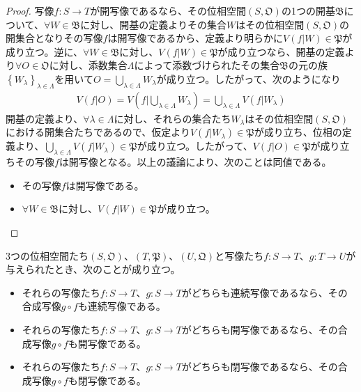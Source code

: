 \documentclass[dvipdfmx]{jsarticle}
\begin{document}
\begin{proof}
写像$f:S \rightarrow T$が開写像であるなら、その位相空間$\left( S,\mathfrak{O} \right)$の1つの開基$\mathfrak{B}$について、$\forall W \in \mathfrak{B}$に対し、開基の定義よりその集合$W$はその位相空間$\left( S,\mathfrak{O} \right)$の開集合となりその写像$f$は開写像であるから、定義より明らかに$V\left( f|W \right) \in \mathfrak{P}$が成り立つ。逆に、$\forall W \in \mathfrak{B}$に対し、$V\left( f|W \right) \in \mathfrak{P}$が成り立つなら、開基の定義より$\forall O \in \mathfrak{O}$に対し、添数集合$\varLambda$によって添数づけられたその集合$\mathfrak{B}$の元の族$\left\{ W_{\lambda} \right\}_{\lambda \in \varLambda}$を用いて$O = \bigcup_{\lambda \in \varLambda} W_{\lambda}$が成り立つ。したがって、次のようになり
\begin{align*}
V\left( f|O \right) = V\left( f|\bigcup_{\lambda \in \varLambda} W_{\lambda} \right) = \bigcup_{\lambda \in \varLambda} {V\left( f|W_{\lambda} \right)}
\end{align*}
開基の定義より、$\forall\lambda \in \varLambda$に対し、それらの集合たち$W_{\lambda}$はその位相空間$\left( S,\mathfrak{O} \right)$における開集合たちであるので、仮定より$V\left( f|W_{\lambda} \right) \in \mathfrak{P}$が成り立ち、位相の定義より、$\bigcup_{\lambda \in \varLambda} {V\left( f|W_{\lambda} \right)} \in \mathfrak{P}$が成り立つ。したがって、$V\left( f|O \right) \in \mathfrak{P}$が成り立ちその写像$f$は開写像となる。以上の議論により、次のことは同値である。
\begin{itemize}
\item
  その写像$f$は開写像である。
\item
  $\forall W \in \mathfrak{B}$に対し、$V\left( f|W \right)\in \mathfrak{P}$が成り立つ。
\end{itemize}
\end{proof}
\begin{thm}\label{8.1.3.7}
3つの位相空間たち$\left( S,\mathfrak{O} \right)$、$\left( T,\mathfrak{P} \right)$、$\left( U,\mathfrak{Q} \right)$と写像たち$f:S \rightarrow T$、$g:T \rightarrow U$が与えられたとき、次のことが成り立つ。
\begin{itemize}
\item
  それらの写像たち$f:S \rightarrow T$、$g:S \rightarrow T$がどちらも連続写像であるなら、その合成写像$g \circ f$も連続写像である。
\item
  それらの写像たち$f:S \rightarrow T$、$g:S \rightarrow T$がどちらも開写像であるなら、その合成写像$g \circ f$も開写像である。
\item
  それらの写像たち$f:S \rightarrow T$、$g:S \rightarrow T$がどちらも閉写像であるなら、その合成写像$g \circ f$も閉写像である。
\end{itemize}
\end{thm}
\end{document}
